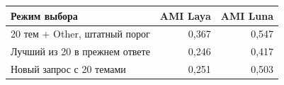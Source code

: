 \begin{tabular}{lrr}\toprule
Режим выбора & AMI Laya & AMI Luna\\\midrule
20 тем + Other, штатный порог & 0,367 & 0,547\\
Лучший из 20 в прежнем ответе & 0,246 & 0,417\\
Новый запрос с 20 темами & 0,251 & 0,503\\
\bottomrule\end{tabular}
